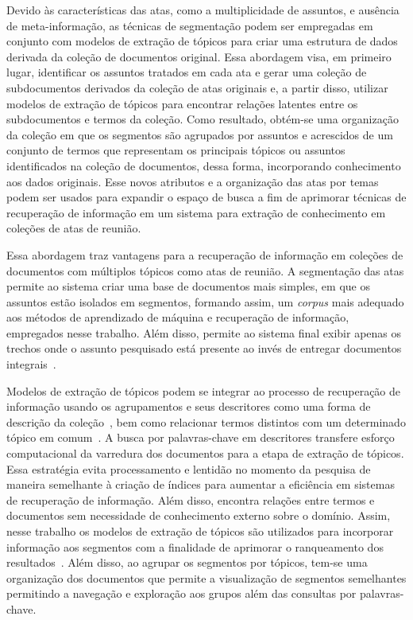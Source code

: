 Devido às características das atas, como a multiplicidade de assuntos, e ausência de meta-informação, as técnicas de segmentação podem ser empregadas em conjunto com modelos de extração de tópicos para criar uma estrutura de dados derivada da coleção de documentos original. 
Essa abordagem visa, em primeiro lugar, identificar os assuntos tratados em cada ata e gerar uma coleção de subdocumentos derivados da coleção de atas originais e, a partir disso, utilizar modelos de extração de tópicos para encontrar relações latentes entre os subdocumentos e termos da coleção.
Como resultado, obtém-se uma organização da coleção em que os segmentos são agrupados por assuntos e acrescidos de um conjunto de termos que representam os principais tópicos ou assuntos identificados na coleção de documentos, dessa forma, incorporando conhecimento aos dados originais. Esse novos atributos e a organização das atas por temas podem ser usados para 
expandir o espaço de busca a fim de aprimorar técnicas de recuperação de informação em um sistema para extração de conhecimento em coleções de atas de reunião.




Essa abordagem traz vantagens para a recuperação de informação em coleções de documentos com múltiplos tópicos como atas de reunião.
A segmentação das atas permite ao sistema criar uma base de documentos mais simples, em que os assuntos estão isolados em segmentos, formando assim, um \textit{corpus} mais adequado aos métodos de aprendizado de máquina e recuperação de informação, empregados nesse trabalho. Além disso, permite ao sistema final exibir apenas os trechos onde o assunto pesquisado está presente ao invés de entregar documentos integrais~\cite{Tagarelli2013, Jeong:2010, Prince2007, Huang2003}. 

Modelos de extração de tópicos podem se integrar ao processo de recuperação de informação usando os agrupamentos e seus descritores como uma forma de descrição da coleção~\cite{Zhai2017, Xing2009}, bem como relacionar termos distintos com um determinado tópico em comum~\cite{WEIXING}. A busca por palavras-chave em descritores transfere esforço computacional da varredura dos documentos para a etapa de extração de tópicos. Essa estratégia evita processamento e lentidão no momento da pesquisa de maneira semelhante à criação de índices para aumentar a eficiência em sistemas de recuperação de informação. Além disso, encontra relações entre termos e documentos sem necessidade de conhecimento externo sobre o domínio. Assim, nesse trabalho os modelos de extração de tópicos são utilizados para incorporar informação aos segmentos com a finalidade de aprimorar o ranqueamento dos resultados~\cite{Maracini2010, WEIXING}. 
% 
Além disso, ao agrupar os segmentos por tópicos, tem-se uma organização dos documentos que permite a visualização de segmentos semelhantes permitindo a navegação e exploração aos grupos além das consultas por palavras-chave.
%


